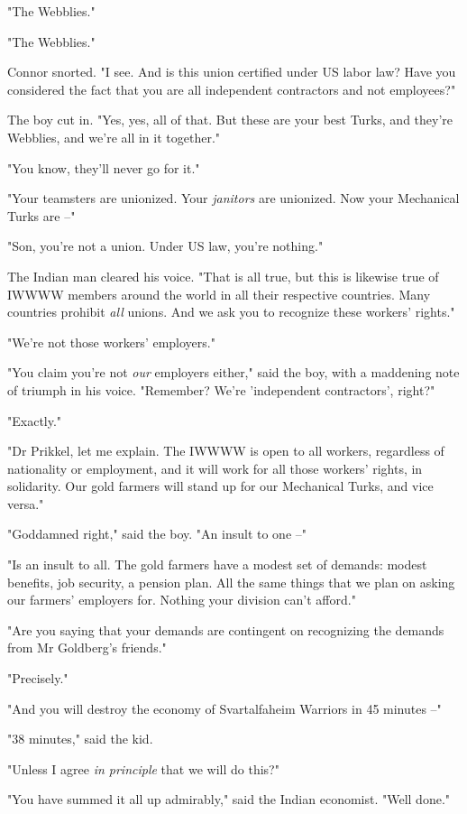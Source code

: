 "The Webblies."

"The Webblies."

Connor snorted. "I see. And is this union certified under US labor
law? Have you considered the fact that you are all independent
contractors and not employees?"

The boy cut in. "Yes, yes, all of that. But these are your best
Turks, and they're Webblies, and we're all in it together."

"You know, they'll never go for it."

"Your teamsters are unionized. Your \emph{janitors} are unionized.
Now your Mechanical Turks are --"

"Son, you're not a union. Under US law, you're nothing."

The Indian man cleared his voice. "That is all true, but this is
likewise true of IWWWW members around the world in all their
respective countries. Many countries prohibit \emph{all} unions.
And we ask you to recognize these workers' rights."

"We're not those workers' employers."

"You claim you're not \emph{our} employers either," said the boy,
with a maddening note of triumph in his voice. "Remember? We're
'independent contractors', right?"

"Exactly."

"Dr Prikkel, let me explain. The IWWWW is open to all workers,
regardless of nationality or employment, and it will work for all
those workers' rights, in solidarity. Our gold farmers will stand
up for our Mechanical Turks, and vice versa."

"Goddamned right," said the boy. "An insult to one --"

"Is an insult to all. The gold farmers have a modest set of
demands: modest benefits, job security, a pension plan. All the
same things that we plan on asking our farmers' employers for.
Nothing your division can't afford."

"Are you saying that your demands are contingent on recognizing the
demands from Mr Goldberg's friends."

"Precisely."

"And you will destroy the economy of Svartalfaheim Warriors in 45
minutes --"

"38 minutes," said the kid.

"Unless I agree \emph{in principle} that we will do this?"

"You have summed it all up admirably," said the Indian economist.
"Well done."

